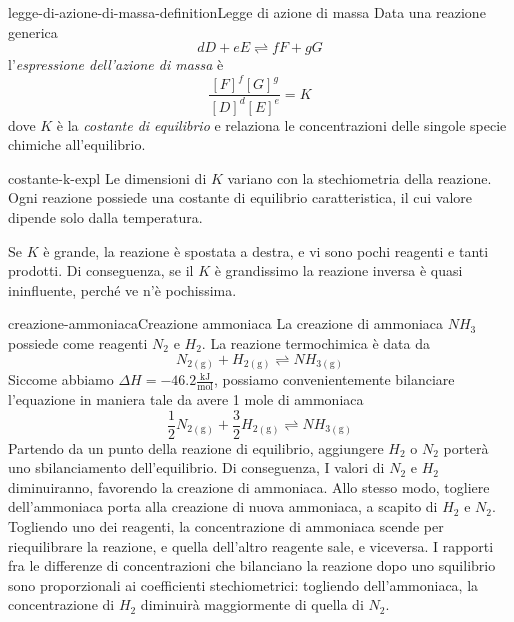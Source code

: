 \documentclass[preview]{standalone}
\begin{document}


\begin{snippetdefinition}{legge-di-azione-di-massa-definition}{Legge di azione di massa}
    Data una reazione generica
    \[
        dD + eE \rightleftharpoons fF + gG
    \]
    l'\textit{espressione dell'azione di massa} è
    \[ \frac{{[F]}^f{[G]}^g}{{[D]}^d{[E]}^e} = K \]
    dove \(K\)  è la \textit{costante di equilibrio} e relaziona
    le concentrazioni delle singole specie chimiche all'equilibrio.
\end{snippetdefinition}

\begin{snippet}{costante-k-expl}
    Le dimensioni di \(K\) variano con la stechiometria della reazione.\\
    Ogni reazione possiede una costante di equilibrio caratteristica,
    il cui valore dipende solo dalla temperatura.

    Se \(K\) è grande, la reazione è spostata a destra,
    e vi sono pochi reagenti e tanti prodotti.
    Di conseguenza, se il \(K\) è grandissimo la reazione inversa è quasi
    ininfluente, perché ve n'è pochissima.
\end{snippet}

\begin{snippetexample}{creazione-ammoniaca}{Creazione ammoniaca}
    La creazione di ammoniaca \(NH_3\) possiede come reagenti \(N_2\) e \(H_2\).
    La reazione termochimica è data da
    \[
        N_{2(\text{g})} + H_{2(\text{g})}   \rightleftharpoons NH_{3(\text{g})}      
    \]
    Siccome abbiamo \(\Delta H = -46.2 \frac{\text{kJ}}{\text{mol}}\),
    possiamo convenientemente bilanciare l'equazione in maniera tale da avere 1 mole di ammoniaca
    \[
        \frac{1}{2}N_{2(\text{g})} + \frac{3}{2}H_{2(\text{g})}   \rightleftharpoons NH_{3(\text{g})}
    \]
    Partendo da un punto della reazione di equilibrio,
    aggiungere \(H_2\) o \(N_2\) porterà uno sbilanciamento dell'equilibrio.
    Di conseguenza,
    I valori di \(N_2\) e \(H_2\) diminuiranno, favorendo la creazione di ammoniaca.
    Allo stesso modo, togliere dell'ammoniaca porta alla creazione di nuova ammoniaca, a scapito
    di \(H_2\) e \(N_2\).
    Togliendo uno dei reagenti, la concentrazione di ammoniaca scende per riequilibrare la reazione,
    e quella dell'altro reagente sale, e viceversa.
    I rapporti fra le differenze di concentrazioni che bilanciano la reazione dopo
    uno squilibrio sono proporzionali ai coefficienti stechiometrici:
    togliendo dell'ammoniaca, la concentrazione di \(H_2\) diminuirà maggiormente di quella di \(N_2\).
\end{snippetexample}
\end{document}

